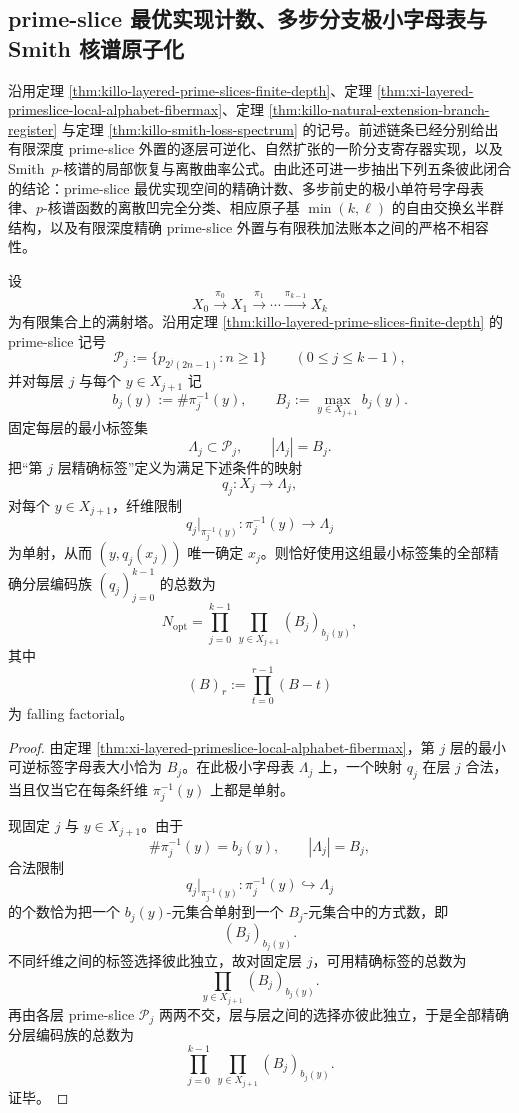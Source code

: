 \subsection{prime-slice 最优实现计数、多步分支极小字母表与 Smith 核谱原子化}\label{subsec:conclusion-primeslice-multistep-branch-smith-atomicity}
沿用定理 \ref{thm:killo-layered-prime-slices-finite-depth}、定理 \ref{thm:xi-layered-primeslice-local-alphabet-fibermax}、定理 \ref{thm:killo-natural-extension-branch-register} 与定理 \ref{thm:killo-smith-loss-spectrum} 的记号。前述链条已经分别给出有限深度 prime-slice 外置的逐层可逆化、自然扩张的一阶分支寄存器实现，以及 Smith \(\,p\)-核谱的局部恢复与离散曲率公式。由此还可进一步抽出下列五条彼此闭合的结论：prime-slice 最优实现空间的精确计数、多步前史的极小单符号字母表律、\(p\)-核谱函数的离散凹完全分类、相应原子基 \(\min(k,\ell)\) 的自由交换幺半群结构，以及有限深度精确 prime-slice 外置与有限秩加法账本之间的严格不相容性。

\begin{theorem}\label{thm:conclusion-primeslice-optimal-implementations-falling-factorial}
设
\[
X_0\xrightarrow{\pi_0}X_1\xrightarrow{\pi_1}\cdots\xrightarrow{\pi_{k-1}}X_k
\]
为有限集合上的满射塔。沿用定理 \ref{thm:killo-layered-prime-slices-finite-depth} 的 prime-slice 记号
\[
\mathcal P_j:=\{p_{2^j(2n-1)}:n\ge 1\}
\qquad(0\le j\le k-1),
\]
并对每层 \(j\) 与每个 \(y\in X_{j+1}\) 记
\[
b_j(y):=\#\pi_j^{-1}(y),
\qquad
B_j:=\max_{y\in X_{j+1}}b_j(y).
\]
固定每层的最小标签集
\[
\Lambda_j\subset \mathcal P_j,
\qquad
|\Lambda_j|=B_j.
\]
把“第 \(j\) 层精确标签”定义为满足下述条件的映射
\[
q_j:X_j\to \Lambda_j,
\]
对每个 \(y\in X_{j+1}\)，纤维限制
\[
q_j|_{\pi_j^{-1}(y)}:\pi_j^{-1}(y)\to \Lambda_j
\]
为单射，从而 \((y,q_j(x_j))\) 唯一确定 \(x_j\)。则恰好使用这组最小标签集的全部精确分层编码族 \((q_j)_{j=0}^{k-1}\) 的总数为
\[
N_{\mathrm{opt}}
=
\prod_{j=0}^{k-1}\ \prod_{y\in X_{j+1}} (B_j)_{b_j(y)},
\]
其中
\[
(B)_r:=\prod_{t=0}^{r-1}(B-t)
\]
为 falling factorial。
\end{theorem}
\begin{proof}
由定理 \ref{thm:xi-layered-primeslice-local-alphabet-fibermax}，第 \(j\) 层的最小可逆标签字母表大小恰为 \(B_j\)。在此极小字母表 \(\Lambda_j\) 上，一个映射 \(q_j\) 在层 \(j\) 合法，当且仅当它在每条纤维 \(\pi_j^{-1}(y)\) 上都是单射。

现固定 \(j\) 与 \(y\in X_{j+1}\)。由于
\[
\#\pi_j^{-1}(y)=b_j(y),
\qquad
|\Lambda_j|=B_j,
\]
合法限制
\[
q_j|_{\pi_j^{-1}(y)}:\pi_j^{-1}(y)\hookrightarrow \Lambda_j
\]
的个数恰为把一个 \(b_j(y)\)-元集合单射到一个 \(B_j\)-元集合中的方式数，即
\[
(B_j)_{b_j(y)}.
\]
不同纤维之间的标签选择彼此独立，故对固定层 \(j\)，可用精确标签的总数为
\[
\prod_{y\in X_{j+1}}(B_j)_{b_j(y)}.
\]
再由各层 prime-slice \(\mathcal P_j\) 两两不交，层与层之间的选择亦彼此独立，于是全部精确分层编码族的总数为
\[
\prod_{j=0}^{k-1}\ \prod_{y\in X_{j+1}} (B_j)_{b_j(y)}.
\]
证毕。
\end{proof}

